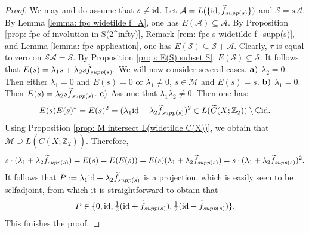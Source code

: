\documentclass[11pt]{amsart}
\newcommand{\id}{{\rm id}}
\newcommand{\suppg}{{\it supp}}
\theoremstyle{plain}
\theoremstyle{definition}
\theoremstyle{remark}
\numberwithin{equation}{section}
\begin{document}
\begin{proof}
	We may and do assume that $s \neq \id$.
	Let $\mathcal A=L(\{\id,\widetilde f_{\suppg(s)}\})$ and $\mathcal S=s\mathcal A$. By Lemma \ref{lemma: fpc widetilde f_A}, one has $E(\mathcal A)\subseteq\mathcal A$. By Proposition \ref{prop: fpc of involution in S(2^infty)}, Remark \ref{rem: fpc s widetilde f_supp(s)}, and Lemma \ref{lemma: fpc application}, one has $E(\mathcal S)\subseteq\mathcal S+\mathcal A$.
	Clearly, $\tau$ is equal to zero on $\mathcal S\mathcal A=\mathcal S$. By Proposition \ref{prop: E(S) subset S}, $E(\mathcal S)\subseteq\mathcal S$. It follows that 
	$ E(s)=\lambda_1 s+\lambda_2 s\widetilde f_{\suppg(s)}.$ We will now consider several cases.
	\vskip 0.1cm\noindent
	${\bf a)}$ $\lambda_2=0$. Then
	either $\lambda_1=0$ and $E(s)=0$ or $\lambda_1\neq 0$, $s\in \mathcal M$ and $E(s)=s$.
	\vskip 0.1cm\noindent
	${\bf b)}$ $\lambda_1=0$. Then $E(s)=\lambda_2 s\widetilde f_{\suppg(s)}$.
	\vskip 0.1cm\noindent   
	${\bf c)}$ Assume that $\lambda_1\lambda_2\neq 0$. Then one has:
	$$E(s)E(s)^*=E(s)^2=(\lambda_1\id +\lambda_2 \widetilde f_{\suppg(s)})^2\in L(\widetilde C(X;\mathbb Z_2))\setminus \mathbb C\id.$$ Using Proposition \ref{prop: M intersect L(widetilde C(X))}, we obtain that $\mathcal M\supseteq L(\widetilde C(X;\mathbb Z_2))$. Therefore,
	$$s\cdot(\lambda_1 +\lambda_2\widetilde f_{\suppg(s)})=E(s)=E(E(s))=E(s)(\lambda_1 +\lambda_2\widetilde f_{\suppg(s)})=s\cdot (\lambda_1 +\lambda_2\widetilde f_{\suppg(s)})^2.$$ It follows that $P:=\lambda_1\id +\lambda_2\widetilde f_{\suppg(s)}$ is a projection, which is easily seen to be selfadjoint, from which it is straightforward to obtain that 
	$$P\in\{0,\id,\tfrac{1}{2}(\id+\widetilde f_{\suppg(s)}),\tfrac{1}{2}(\id-\widetilde f_{\suppg(s)})\}.$$ 
	This finishes the proof.
\end{proof}
\end{document}
